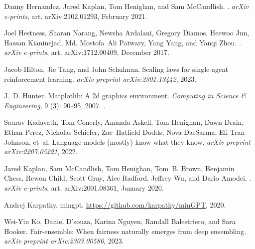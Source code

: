 \documentclass{article} %
\begin{document}
\begin{thebibliography}{62}
Danny {Hernandez}, Jared {Kaplan}, Tom {Henighan}, and Sam {McCandlish}.
.
\newblock \emph{arXiv e-prints}, art. arXiv:2102.01293, February 2021.

Joel {Hestness}, Sharan {Narang}, Newsha {Ardalani}, Gregory {Diamos}, Heewoo
  {Jun}, Hassan {Kianinejad}, Md. Mostofa~Ali {Patwary}, Yang {Yang}, and Yanqi
  {Zhou}.
.
\newblock \emph{arXiv e-prints}, art. arXiv:1712.00409, December 2017.

Jacob Hilton, Jie Tang, and John Schulman.
\newblock Scaling laws for single-agent reinforcement learning.
\newblock \emph{arXiv preprint arXiv:2301.13442}, 2023.

J.~D. Hunter.
\newblock Matplotlib: A 2d graphics environment.
\newblock \emph{Computing in Science \& Engineering}, 9 (3):
  90--95, 2007.
\newblock {}.

Saurav Kadavath, Tom Conerly, Amanda Askell, Tom Henighan, Dawn Drain, Ethan
  Perez, Nicholas Schiefer, Zac~Hatfield Dodds, Nova DasSarma, Eli
  Tran-Johnson, et~al.
\newblock Language models (mostly) know what they know.
\newblock \emph{arXiv preprint arXiv:2207.05221}, 2022.

Jared {Kaplan}, Sam {McCandlish}, Tom {Henighan}, Tom~B. {Brown}, Benjamin
  {Chess}, Rewon {Child}, Scott {Gray}, Alec {Radford}, Jeffrey {Wu}, and Dario
  {Amodei}.
.
\newblock \emph{arXiv e-prints}, art. arXiv:2001.08361, January 2020.

Andrej Karpathy.
\newblock mingpt.
\newblock \url{https://github.com/karpathy/minGPT}, 2020.

Wei-Yin Ko, Daniel D'souza, Karina Nguyen, Randall Balestriero, and Sara
  Hooker.
\newblock Fair-ensemble: When fairness naturally emerges from deep ensembling.
\newblock \emph{arXiv preprint arXiv:2303.00586}, 2023.


\end{thebibliography}
\end{document}
